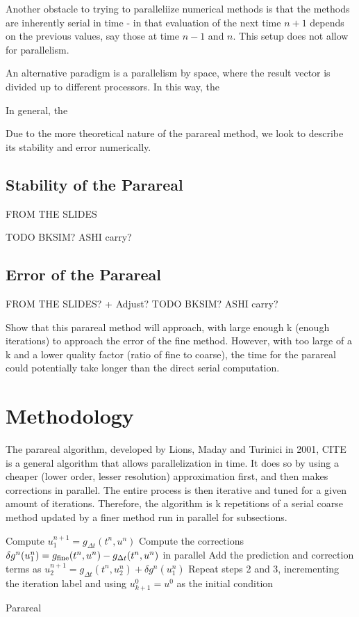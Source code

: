 \documentclass[letterpaper,twocolumn,11pt]{article}
\begin{document}
Another obstacle to trying to paralleliize numerical methods is that the methods are inherently serial in time - in that evaluation of the next time $n+1$ depends on the previous values, say those at time $n-1$ and $n$.  This setup does not allow for parallelism.

 An alternative paradigm is a parallelism by space, where the result vector is divided up to different processors.  In this way, the 

In general, the

Due to the more theoretical nature of the parareal method, we look to describe its stability and error numerically.

\subsection{Stability of the Parareal}

FROM THE SLIDES 

TODO BKSIM? ASHI carry?

\subsection{Error of the Parareal}

FROM THE SLIDES? + Adjust?
TODO BKSIM? ASHI carry?

Show that this parareal method will approach, with large enough k (enough iterations) to approach the error of the fine method.  However, with too large of a k and a lower quality factor (ratio of fine to coarse), the time for the parareal could potentially take longer than the direct serial computation.

\section{Methodology}

The parareal algorithm, developed by Lions, Maday and Turinici in 2001, CITE is a general algorithm that allows parallelization in time.  It does so by using a cheaper (lower order, lesser resolution) approximation first, and then makes corrections in parallel.  The entire process is then iterative and tuned for a given amount of iterations.  Therefore, the algorithm is k repetitions of a serial coarse method updated by a finer method run in parallel for subsections.

\begin{algorithm}[t]
    Compute $u_1^{n+1} = g_{\Delta t}(t^n, u^n)$\;
    Compute the corrections $\delta g^n(u_1^n) = g_{\textnormal{fine}}(t^n,
    u^n) - g_{\Delta t}(t^n, u^n)$ in parallel\;
    Add the prediction and correction terms as $u_2^{n+1} = g_{\Delta
    t}(t^n, u_2^n) + \delta g^n(u_1^n)$\;
    Repeat steps 2 and 3, incrementing the iteration label and using $u_{k+1}^0
    = u^0$ as the initial condition\
 \caption{Parareal}
 \label{alg:parareal}
\end{algorithm}
\end{document}
